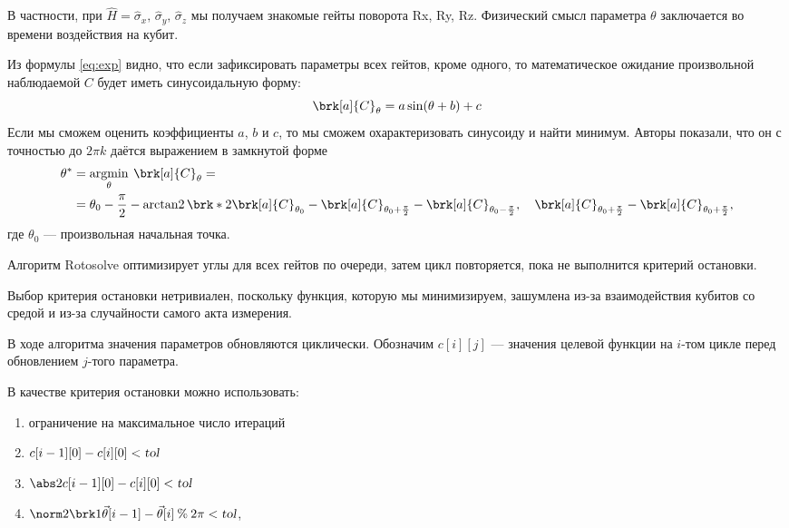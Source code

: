 В частности, при 
$\hat H = \hat \sigma_x,\, \hat \sigma_y,\, \hat \sigma_z$
мы получаем знакомые гейты поворота Rx, Ry, Rz.
Физический смысл параметра $\theta$ заключается во времени воздействия на кубит.



Из формулы \eqref{eq:exp} видно, что если зафиксировать параметры всех гейтов, кроме одного, то математическое ожидание произвольной наблюдаемой $C$ будет иметь синусоидальную форму:
$$
\brk[a]{C}_\theta = a \sin(\theta + b) + c
$$
Если мы сможем оценить коэффициенты $a$, $b$ и $c$, то мы сможем охарактеризовать синусоиду и найти минимум. Авторы показали, что он с точностью до $2\pi k$ даётся выражением в замкнутой форме
\begin{align*}
\theta^* 
&= \argmin_\theta \: \brk[a]{C}_\theta = \\
&= \theta_0 - \frac{\pi}{2} - \arctantwo \brk*{
   2\brk[a]{C}_{\theta_0} - 
    \brk[a]{C}_{\theta_0 + \frac{\pi}{2}} - 
    \brk[a]{C}_{\theta_0 - \frac{\pi}{2}}
    ,\quad
    \brk[a]{C}_{\theta_0 + \frac{\pi}{2}} - 
    \brk[a]{C}_{\theta_0 + \frac{\pi}{2}}
},
\end{align*}
где $\theta_0$ --- произвольная начальная точка.

Алгоритм Rotosolve оптимизирует углы для всех гейтов по очереди, затем цикл повторяется, пока не выполнится критерий остановки. 


Выбор критерия остановки нетривиален, поскольку функция, которую мы минимизируем, зашумлена из-за взаимодействия кубитов со средой и из-за случайности самого акта измерения.

В ходе алгоритма значения параметров обновляются циклически. Обозначим $c[i][j]$ --- значения целевой функции на $i$-том цикле перед обновлением $j$-того параметра.%

В качестве критерия остановки можно использовать:

\begin{enumerate}
    \item ограничение на максимальное число итераций
    \item $c[i-1][0] - c[i][0] < \textsl{tol}$
    \item $\abs2{c[i-1][0] - c[i][0]} < \textsl{tol}$
    \item $\norm2{\brk1{\vec \theta[i-1] - \vec \theta[i]} \mathbin{\%} 2\pi } < \textsl{tol}$,
\end{enumerate}

